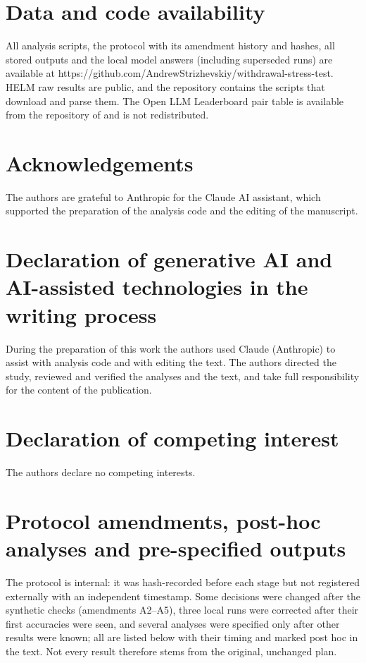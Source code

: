 \documentclass[preprint,12pt,authoryear]{elsarticle}
\begin{document}
\section*{Data and code availability}
All analysis scripts, the protocol with its amendment history and hashes, all stored outputs and the local model answers (including superseded runs) are available at https://github.com/AndrewStrizhevskiy/withdrawal-stress-test. HELM raw results are public, and the repository contains the scripts that download and parse them. The Open LLM Leaderboard pair table is available from the repository of \citet{kim2025correlated} and is not redistributed.

\section*{Acknowledgements}
The authors are grateful to Anthropic for the Claude AI assistant, which supported the preparation of the analysis code and the editing of the manuscript.

\section*{Declaration of generative AI and AI-assisted technologies in the writing process}
During the preparation of this work the authors used Claude (Anthropic) to assist with analysis code and with editing the text. The authors directed the study, reviewed and verified the analyses and the text, and take full responsibility for the content of the publication.

\section*{Declaration of competing interest}
The authors declare no competing interests.

\appendix
\section{Protocol amendments, post-hoc analyses and pre-specified outputs}
\label{app:amend}
\footnotesize
The protocol is internal: it was hash-recorded before each stage but not registered externally with an independent timestamp. Some decisions were changed after the synthetic checks (amendments A2--A5), three local runs were corrected after their first accuracies were seen, and several analyses were specified only after other results were known; all are listed below with their timing and marked post hoc in the text. Not every result therefore stems from the original, unchanged plan.
\end{document}
